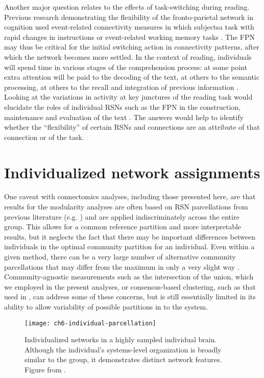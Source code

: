 Another major question relates to the effects of task-switching during reading. Previous research demonstrating the flexibility of the fronto-parietal network in cognition used event-related connectivity measures in which subjectsa task with rapid changes in instructions or event-related working memory tasks \citep{Cole2013, Braun2015}. The FPN may thus be critical for the initial switching action in connectivity patterns, after which the network becomes more settled. In the context of reading, individuals will spend time in various stages of the comprehension process: at some point extra attention will be paid to the decoding of the text, at others to the semantic processing, at others to the recall and integration of previous information \citep{Spreng2013}. Looking at the variations in activity at key junctures of the reading task would elucidate the roles of individual RSNs such as the FPN in the construction, maintenance and evaluation of the text \citep{Sakai2008}. The answers would help to identify whether the ``flexibility'' of certain RSNs and connections are an attribute of that connection or of the task.

\section{Individualized network assignments}

One caveat with connectomics analyses, including those presented here, are that results for the modularity analyses are often based on RSN parcellations from previous literature (e.g. \citep{Power2011}) and are applied indiscriminately across the entire group. This allows for a common reference partition and more interpretable results, but it neglects the fact that there may be important differences between individuals in the optimal community partition for an individual. Even within a given method, there can be a very large number of alternative community parcellations that may differ from the maximum in only a very slight way \citep{Good2010}. Community-agnostic measurements such as the intersection of the union, which we employed in the present analyses, or consensus-based clustering, such as that used in \citep{Power2011}, can address some of these concerns, but is still essentially limited in its ability to allow variability of possible partitions in to the system. 

\begin{figure}[t]
	\centering
	\texttt{[image: ch6-individual-parcellation]}
	\caption[Individualized networks in a highly sampled individual brain.]{Individualized networks in a highly sampled individual brain. Although the individual's systems-level organization is broadly similar to the group, it demonstrates distinct network features. Figure from \citep{Laumann2015}.}
	\label{fig:ch6-individual-parcellation}
\end{figure}

